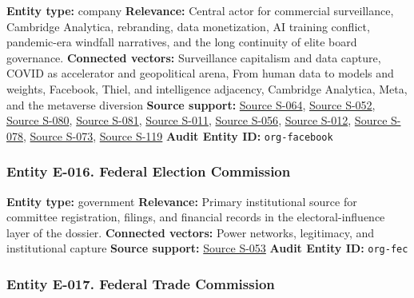 \documentclass[
  american,
  11pt,
  letterpaper,
]{article}
\begin{document}
\textbf{Entity type:} company \textbf{Relevance:} Central actor for
commercial surveillance, Cambridge Analytica, rebranding, data
monetization, AI training conflict, pandemic-era windfall narratives,
and the long continuity of elite board governance. \textbf{Connected
vectors:} Surveillance capitalism and data capture, COVID as accelerator
and geopolitical arena, From human data to models and weights, Facebook,
Thiel, and intelligence adjacency, Cambridge Analytica, Meta, and the
metaverse diversion \textbf{Source support:}
\hyperref[source-s-064-ftc-imposes-5-billion-penalty-and-sweeping-new-privacy-restrictions-on-facebook]{Source
S-064},
\hyperref[source-s-052-facebook-inc-registration-statement-on-form-s-1]{Source
S-052},
\hyperref[source-s-080-meta-platforms-inc-2022-definitive-proxy-statement]{Source
S-080}, \hyperref[source-s-081-the-facebook-company-is-now-meta]{Source
S-081},
\hyperref[source-s-011-meta-ceo-mark-zuckerberg-kicks-off-developer-conference-with-focus-on-ai-virtual-reality]{Source
S-011},
\hyperref[source-s-056-meta-sees-ai-spending-accelerating-as-earnings-top-forecasts]{Source
S-056},
\hyperref[source-s-012-mark-zuckerberg-personally-authorized-meta-s-copyright-infringement-publishers-allege]{Source
S-012},
\hyperref[source-s-078-with-reality-labs-meta-risks-heading-down-slippery-slope-of-overspending-again]{Source
S-078},
\hyperref[source-s-073-meta-slashes-prices-for-vr-headsets]{Source
S-073},
\hyperref[source-s-119-big-tech-announces-striking-pandemic-gains-as-small-businesses-strain-to-find-their-footing]{Source
S-119} \textbf{Audit Entity ID:} \texttt{org-facebook}

\subsubsection{Entity E-016. Federal Election
Commission}\label{entity-e-016-federal-election-commission}

\textbf{Entity type:} government \textbf{Relevance:} Primary
institutional source for committee registration, filings, and financial
records in the electoral-influence layer of the dossier.
\textbf{Connected vectors:} Power networks, legitimacy, and
institutional capture \textbf{Source support:}
\hyperref[source-s-053-leading-the-future-committee-overview]{Source
S-053} \textbf{Audit Entity ID:} \texttt{org-fec}

\subsubsection{Entity E-017. Federal Trade
Commission}\label{entity-e-017-federal-trade-commission}
\end{document}
